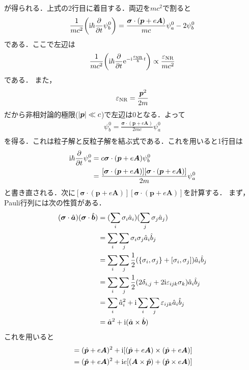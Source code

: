 \documentclass{report}
\begin{document}
が得られる．上式の2行目に着目する．両辺を$mc^2$で割ると
\begin{align}
  \frac{1}{mc^2}\qty(\mathrm{i}\hbar\frac{\partial}{\partial t}\psi_b^0) = \frac{\bm{\sigma}\cdot(\bm{p} + e\bm{A})}{mc}\psi^0_a - 2 \psi^0_b
\end{align}
である．ここで左辺は
\begin{align}
  \frac{1}{mc^2}\qty(\mathrm{i}\hbar\frac{\partial}{\partial t}\mathrm{e}^{-\mathrm{i}\frac{\varepsilon_{\mathrm{NR}}}{\hbar} t}) \propto \frac{\varepsilon_{\mathrm{NR}}}{mc^2}
\end{align}
である．
また，
\begin{align}
  \varepsilon_{\mathrm{NR}} = \frac{\bm{p}^2}{2m}
\end{align}
だから非相対論的極限($\abs{\bm{p}} \ll c$)で左辺は0となる．よって
\begin{align}
  \psi_b^0 = \frac{\bm{\sigma}\cdot(\bm{p} + e\bm{A})}{2mc}\psi^0_a\\
\end{align}
を得る．これは粒子解と反粒子解を結ぶ式である．これを用いると1行目は
\begin{align}
  \mathrm{i}\hbar\frac{\partial}{\partial t}\psi^0_a &= c\bm{\sigma} \cdot (\bm{p} + e\bm{A})\psi_b^0\\
  &= \frac{[\bm{\sigma}\cdot(\bm{p} + e\bm{A})][\bm{\sigma}\cdot(\bm{p} + e\bm{A})]}{2m}\psi^0_a
\end{align}
と書き直される．次に$[\bm{\sigma}\cdot(\bm{p} + e\bm{A})][\bm{\sigma}\cdot(\bm{p} + e\bm{A})]$を計算する．
まず，Pauli行列には次の性質がある．
\begin{align}
  (\bm{\sigma}\cdot\hat{\bm{a}})(\bm{\sigma}\cdot\hat{\bm{b}}) &= (\sum_{i} \sigma_i \hat{a}_i) (\sum_{j} \sigma_j \hat{a}_j)\\
  &= \sum_{i} \sum_{j} \sigma_{i} \sigma_{j} \hat{a}_i \hat{b}_j\\
  &= \sum_{i} \sum_{j} \frac{1}{2}(\qty{\sigma_i, \sigma_j} + [\sigma_i, \sigma_j]) \hat{a}_i \hat{b}_j\\
  &= \sum_{i} \sum_{j} \frac{1}{2}(2 \delta_{i,j} + 2\mathrm{i} \varepsilon_{ijk} \sigma_k) \hat{a}_i \hat{b}_j\\
  &= \sum_{i} \hat{a}_i^2 + \mathrm{i} \sum_{i} \sum_{j} \varepsilon_{ijk} \hat{a}_i \hat{b}_j\\
  &= \hat{\bm{a}}^2 + \mathrm{i}(\hat{\bm{a}} \times \hat{\bm{b}})
\end{align}
これを用いると
\begin{align}
  [\bm{\sigma}\cdot(\bm{p} + e\bm{A})][\bm{\sigma}\cdot(\bm{p} + e\bm{A})] &= (\hat{\bm{p}} + e\bm{A})^2 + \i[(\hat{\bm{p}} + e\bm{A}) \times (\hat{\bm{p}} + e\bm{A})]\\
  &= (\hat{\bm{p}} + e\bm{A})^2 + \i e[(\bm{A} \times \hat{\bm{p}}) + (\hat{\bm{p}} \times e\bm{A})]\\
\end{align}
\end{document}
